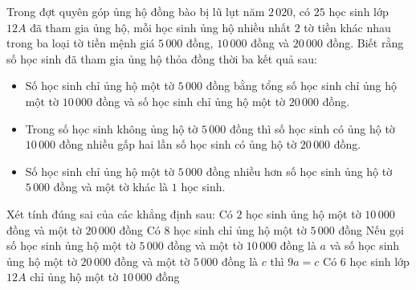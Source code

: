 \begin{ex}
Trong đợt quyên góp ủng hộ đồng bào bị lũ lụt năm $2\,020$, có $25$ học sinh lớp $12A$ đã tham gia ủng hộ, mỗi học sinh ủng hộ nhiều nhất $2$ tờ tiền khác nhau trong ba loại tờ tiền mệnh giá $5\, 000$ đồng, $10\, 000$ đồng và $20\, 000$ đồng. Biết rằng số học sinh đã tham gia ủng hộ thỏa đồng thời ba kết quả sau:
\begin{itemize}
\item Số học sinh chỉ ủng hộ một tờ $5\, 000$ đồng bằng tổng số học sinh chỉ ủng hộ một tờ $10\, 000$ đồng và số học sinh chỉ ủng hộ một tờ $20\, 000$ đồng.
\item Trong số học sinh không ủng hộ tờ $5\, 000$ đồng thì số học sinh có ủng hộ tờ $10\, 000$ đồng nhiều gấp hai lần số học sinh có ủng hộ tờ $20\, 000$ đồng.
\item Số học sinh chỉ ủng hộ một tờ $5\, 000$ đồng nhiều hơn số học sinh ủng hộ tờ $5\, 000$ đồng và một tờ khác là $1$ học sinh.
\end{itemize}
Xét tính đúng sai của các khẳng định sau:
\choiceTF
{\True Có $2$ học sinh ủng hộ một tờ $10\, 000$ đồng và một tờ $20\, 000$ đồng}
{\True Có $8$ học sinh chỉ ủng hộ một tờ $5\, 000$ đồng}
{Nếu gọi số học sinh ủng hộ một tờ $5\, 000$ đồng và một tờ $10\, 000$ đồng là $a$ và số học sinh ủng hộ một tờ $20\, 000$ đồng và một tờ $5\, 000$ đồng là $c$ thì $9a = c$}
{\True Có $6$ học sinh lớp $12A$ chỉ ủng hộ một tờ $10\, 000$ đồng}
\end{ex}
